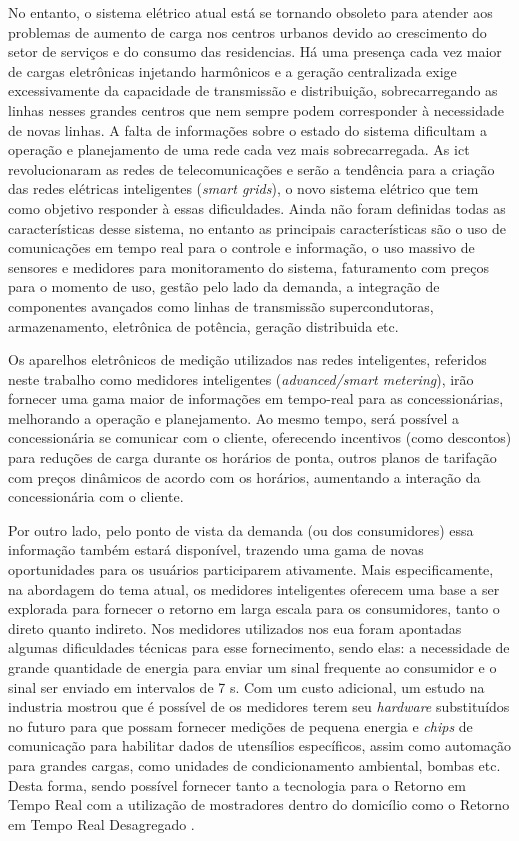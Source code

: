 No entanto, o sistema elétrico atual está 
se tornando obsoleto para atender aos problemas de 
aumento de carga nos centros urbanos devido ao crescimento do setor 
de serviços e do consumo das residencias. Há uma presença cada vez maior
de cargas eletrônicas injetando harmônicos e a geração centralizada exige 
excessivamente da capacidade de transmissão e distribuição, 
sobrecarregando as linhas nesses grandes centros que nem sempre podem 
corresponder à necessidade de novas linhas. A falta de informações sobre o 
estado do sistema dificultam a operação e planejamento de uma rede cada vez mais 
sobrecarregada. As \gls{ict} revolucionaram as redes de telecomunicações e 
serão a tendência para a criação das redes elétricas inteligentes (\emph{smart 
grids}), o novo sistema elétrico que tem como objetivo responder à essas
dificuldades. Ainda não foram definidas todas as características desse sistema,
no entanto as principais características são o uso de comunicações em tempo real
para o controle e informação, o uso massivo de sensores e medidores para
monitoramento do sistema, faturamento com preços para o momento de uso, 
gestão pelo lado da demanda, a integração de 
componentes avançados como linhas de transmissão supercondutoras, armazenamento, 
eletrônica de potência, geração distribuida etc. 
\cite{dissert_caires,aceee_2010_estudos_feedback}

Os aparelhos eletrônicos de medição utilizados nas redes inteligentes, referidos
neste trabalho como medidores inteligentes (\emph{advanced/smart metering}), irão 
fornecer uma gama maior de informações em tempo-real para as concessionárias,
melhorando a operação e planejamento. Ao mesmo tempo, será possível a
concessionária se comunicar com o cliente, oferecendo incentivos (como
descontos) para reduções de carga durante os horários de ponta, 
outros planos de tarifação com preços dinâmicos de acordo com os horários,
aumentando a interação da concessionária com o cliente. 

Por outro lado, pelo ponto de vista da demanda (ou dos consumidores) essa 
informação também estará disponível, trazendo uma gama de novas oportunidades 
para os usuários participarem ativamente. Mais especificamente, na abordagem do
tema atual, os medidores inteligentes oferecem uma base
a ser explorada para fornecer o retorno em larga escala para os consumidores, 
tanto o direto quanto indireto. Nos medidores utilizados nos \gls{eua} foram 
apontadas algumas dificuldades
técnicas para esse fornecimento, sendo elas: a necessidade de grande quantidade
de energia para enviar um sinal frequente ao consumidor e o sinal ser enviado em
intervalos de 7 s. Com um custo adicional, um estudo na industria mostrou que
é possível de os medidores terem seu \emph{hardware} substituídos 
no futuro para que possam fornecer medições de pequena energia e \emph{chips} 
de comunicação para habilitar dados de utensílios específicos, assim como 
automação para grandes cargas, como unidades de condicionamento ambiental, 
bombas etc. Desta forma, sendo possível 
fornecer tanto a tecnologia para o Retorno em Tempo Real com a utilização de 
mostradores dentro do domicílio como o Retorno em Tempo Real Desagregado
\cite{aceee_2010_estudos_feedback}.

